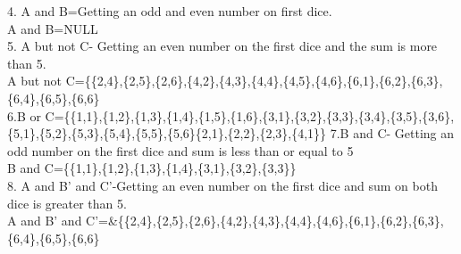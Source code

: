 \documentclass{article}
\begin{document}
4. A and B=Getting an odd and even number on first dice.\\
A and B=NULL\\
5. A but not C- Getting an even number on the first dice and the sum is more than 5.\\
A but not C=\{\{2,4\},\{2,5\},\{2,6\},\{4,2\},\{4,3\},\{4,4\},\{4,5\},\{4,6\},\{6,1\},\{6,2\},\{6,3\},\{6,4\},\{6,5\},\{6,6\}\\
6.B or C=\{\{1,1\},\{1,2\},\{1,3\},\{1,4\},\{1,5\},\{1,6\},\{3,1\},\{3,2\},\{3,3\},\{3,4\},\{3,5\},\{3,6\},\{5,1\},\{5,2\},\{5,3\},\{5,4\},\{5,5\},\{5,6\}\{2,1\},\{2,2\},\{2,3\},\{4,1\}\}
7.B and C- Getting an odd number on the first dice and sum is less than or equal to 5\\
B and C=\{\{1,1\},\{1,2\},\{1,3\},\{1,4\},\{3,1\},\{3,2\},\{3,3\}\}\\
8. A and B' and C'-Getting an even number on the first dice and sum on both dice is greater than 5.\\
A and B' and C'=&\{\{2,4\},\{2,5\},\{2,6\},\{4,2\},\{4,3\},\{4,4\},\{4,6\},\{6,1\},\{6,2\},\{6,3\},\{6,4\},\{6,5\},\{6,6\}\\
\end{document}
